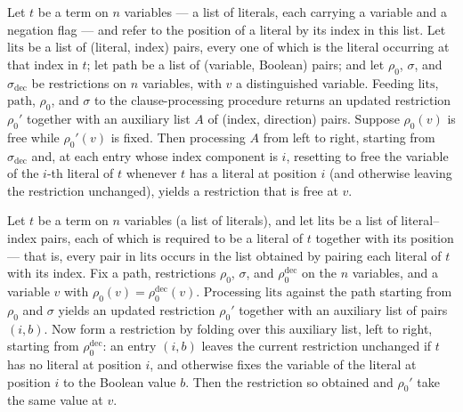 \begin{lemma}
\label{SwitchingLemma.processClauseLits_foldl_sigma_none}
\leanok
{}
Let $t$ be a term on $n$ variables — a list of literals, each carrying a variable and a
negation flag — and refer to the position of a literal by its index in this list. Let
$\mathrm{lits}$ be a list of (literal, index) pairs, every one of which is the literal
occurring at that index in $t$; let $\mathrm{path}$ be a list of (variable, Boolean)
pairs; and let $\rho_0$, $\sigma$, and $\sigma_{\mathrm{dec}}$ be restrictions on $n$
variables, with $v$ a distinguished variable. Feeding $\mathrm{lits}$, $\mathrm{path}$,
$\rho_0$, and $\sigma$ to the clause-processing procedure returns an updated restriction
$\rho_0'$ together with an auxiliary list $A$ of (index, direction) pairs. Suppose
$\rho_0(v)$ is free while $\rho_0'(v)$ is fixed. Then processing $A$ from left to right,
starting from $\sigma_{\mathrm{dec}}$ and, at each entry whose index component is $i$,
resetting to free the variable of the $i$-th literal of $t$ whenever $t$ has a literal
at position $i$ (and otherwise leaving the restriction unchanged), yields a restriction
that is free at $v$.
\end{lemma}

\begin{lemma}
\label{SwitchingLemma.processClauseLits_foldl_rho_eq}
\leanok
{}
Let $t$ be a term on $n$ variables (a list of literals), and let $\mathrm{lits}$ be a
list of literal–index pairs, each of which is required to be a literal of $t$ together
with its position — that is, every pair in $\mathrm{lits}$ occurs in the list obtained
by pairing each literal of $t$ with its index. Fix a path, restrictions $\rho_0$,
$\sigma$, and $\rho_0^{\mathrm{dec}}$ on the $n$ variables, and a variable $v$ with
$\rho_0(v) = \rho_0^{\mathrm{dec}}(v)$. Processing $\mathrm{lits}$ against the path
starting from $\rho_0$ and $\sigma$ yields an updated restriction $\rho_0'$ together
with an auxiliary list of pairs $(i, b)$. Now form a restriction by folding over this
auxiliary list, left to right, starting from $\rho_0^{\mathrm{dec}}$: an entry $(i, b)$
leaves the current restriction unchanged if $t$ has no literal at position $i$, and
otherwise fixes the variable of the literal at position $i$ to the Boolean value $b$.
Then the restriction so obtained and $\rho_0'$ take the same value at $v$.
\end{lemma}

